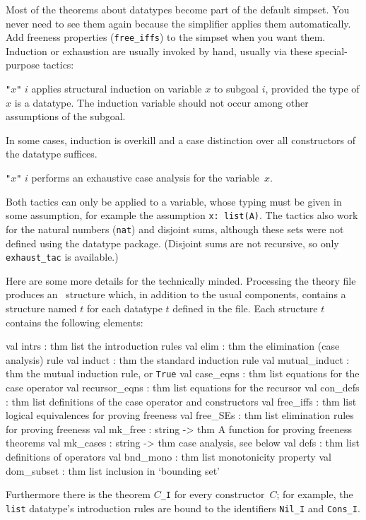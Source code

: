 Most of the theorems about datatypes become part of the default simpset.  You
never need to see them again because the simplifier applies them
automatically.  Add freeness properties (\texttt{free_iffs}) to the simpset
when you want them.  Induction or exhaustion are usually invoked by hand,
usually via these special-purpose tactics:
\begin{ttdescription}
\item[\ttindexbold{induct_tac} {\tt"}$x${\tt"} $i$] applies structural
  induction on variable $x$ to subgoal $i$, provided the type of $x$ is a
  datatype.  The induction variable should not occur among other assumptions
  of the subgoal.
\end{ttdescription}
In some cases, induction is overkill and a case distinction over all
constructors of the datatype suffices.
\begin{ttdescription}
\item[\ttindexbold{exhaust_tac} {\tt"}$x${\tt"} $i$]
 performs an exhaustive case analysis for the variable~$x$.
\end{ttdescription}

Both tactics can only be applied to a variable, whose typing must be given in
some assumption, for example the assumption \texttt{x:\ list(A)}.  The tactics
also work for the natural numbers (\texttt{nat}) and disjoint sums, although
these sets were not defined using the datatype package.  (Disjoint sums are
not recursive, so only \texttt{exhaust_tac} is available.)

\bigskip
Here are some more details for the technically minded.  Processing the
theory file produces an \ML\ structure which, in addition to the usual
components, contains a structure named $t$ for each datatype $t$ defined in
the file.  Each structure $t$ contains the following elements:
\begin{ttbox}
val intrs         : thm list  \textrm{the introduction rules}
val elim          : thm       \textrm{the elimination (case analysis) rule}
val induct        : thm       \textrm{the standard induction rule}
val mutual_induct : thm       \textrm{the mutual induction rule, or \texttt{True}}
val case_eqns     : thm list  \textrm{equations for the case operator}
val recursor_eqns : thm list  \textrm{equations for the recursor}
val con_defs      : thm list  \textrm{definitions of the case operator and constructors}
val free_iffs     : thm list  \textrm{logical equivalences for proving freeness}
val free_SEs      : thm list  \textrm{elimination rules for proving freeness}
val mk_free       : string -> thm  \textrm{A function for proving freeness theorems}
val mk_cases      : string -> thm  \textrm{case analysis, see below}
val defs          : thm list  \textrm{definitions of operators}
val bnd_mono      : thm list  \textrm{monotonicity property}
val dom_subset    : thm list  \textrm{inclusion in `bounding set'}
\end{ttbox}
Furthermore there is the theorem $C$\texttt{_I} for every constructor~$C$; for
example, the \texttt{list} datatype's introduction rules are bound to the
identifiers \texttt{Nil_I} and \texttt{Cons_I}.

